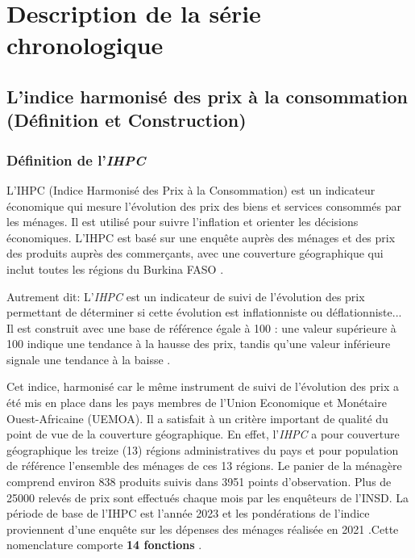 \documentclass[
12pt,          %
a4paper,       %
oneside,       %
openright      %
]{report}
\newcommand{\IHPC}{\textit{IHPC}}
\begin{document}
	\chapter{Description de la série chronologique}
	
	\section{L'indice harmonisé des prix à la consommation (Définition et Construction)}
	\subsection{Définition de l'\IHPC{}}
	

		L'IHPC (Indice Harmonisé des Prix à la Consommation) est un indicateur économique
	qui mesure l'évolution des prix des biens et services consommés par les ménages. Il
	est utilisé pour suivre l'inflation et orienter les décisions économiques. L'IHPC est
	basé sur une enquête auprès des ménages et des prix des produits auprès des
	commerçants, avec une couverture géographique qui inclut toutes les régions du Burkina FASO \citep{insd2025}. 
	
	Autrement dit: L'\IHPC{} est un indicateur de suivi de l'évolution des prix permettant de déterminer si cette évolution est inflationniste ou déflationniste...
	Il est construit avec une base de référence égale à 100 : une valeur 
	supérieure à 100 indique une tendance à la hausse des prix, tandis qu'une 
	valeur inférieure signale une tendance à la baisse \citep{lefaso2025}.
	
	Cet indice, harmonisé car le même instrument de suivi de l'évolution des prix a été mis en place dans les pays membres de l'Union Economique et Monétaire Ouest-Africaine (UEMOA). Il a satisfait à un critère important de 
	qualité du point de vue de la couverture géographique. En effet, l'\IHPC{} a pour couverture géographique les treize (13) régions administratives du pays et pour population de référence l'ensemble des ménages de ces 13 régions. Le 
	panier de la ménagère comprend environ 838 produits suivis dans 3951 points d'observation. Plus de 25000 relevés de prix sont effectués chaque mois par les enquêteurs de l'INSD. La période de base de l'IHPC est l'année 2023 et 
	les pondérations de l'indice proviennent d'une enquête sur les dépenses des ménages réalisée en 2021 .Cette nomenclature comporte \textbf{14 fonctions} \citep{insd2025}.
	
\end{document}
